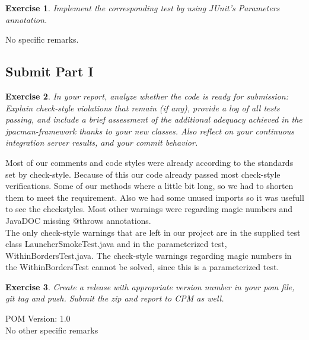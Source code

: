 \documentclass[a4paper]{article}
\newtheorem{thm}{Exercise}
\begin{document}
    \begin{thm}
      Implement the corresponding test by using JUnit’s Parameters annotation.
    \end{thm}
    No specific remarks.
    
  
  \subsection{Submit Part I}
    \begin{thm}
      In your report, analyze whether the code is ready for submission: Explain check-style violations that remain (if any), provide a log of all tests passing, and include a brief assessment of the additional adequacy achieved in the jpacman-framework thanks to your new classes. Also reflect on your continuous integration server results, and your commit behavior.
    \end{thm}
    Most of our comments and code styles were already according to the standards set by check-style.
    Because of this our code already passed most check-style verifications.
    Some of our methods where a little bit long, so we had to shorten them to meet the requirement. 
    Also we had some unused imports so it was usefull to see the checkstyles. 
    Most other warnings were regarding magic numbers and JavaDOC missing @throws annotations. \\
    The only check-style warnings that are left in our project are in the supplied test class LauncherSmokeTest.java and in the parameterized test, WithinBordersTest.java.
    The check-style warnings regarding magic numbers in the WithinBordersTest cannot be solved, since this is a parameterized test.
    
    
    \begin{thm}
      Create a release with appropriate version number in your pom file, git tag and push. Submit the zip and report to CPM as well.
    \end{thm}
    POM Version: 1.0
    \\
    No other specific remarks
    
\end{document}
